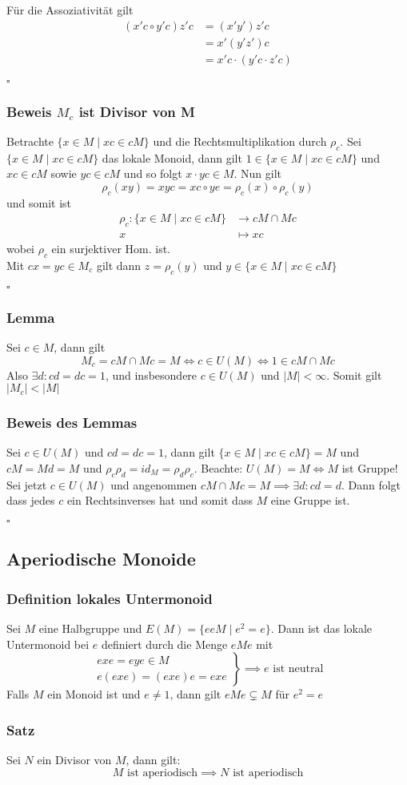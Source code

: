 \documentclass[12pt, german]{article}
\newcommand{\bewiesen}{
	
	\begin{flushright}
		$\square$  \\
\end{flushright}}
\begin{document}
	Für die Assoziativität gilt 
		\begin{align*}
			(x'c \circ y'c)z'c &= (x'y')z'c \\
				&= x'(y'z')c \\
				&= x'c \cdot (y'c \cdot z'c)
		\end{align*}
		\bewiesen

\subsubsection{Beweis $M_c$ ist Divisor von M}
	Betrachte $\{x \in M \mid xc \in cM\}$ und die Rechtsmultiplikation durch $\rho_c$. Sei $\{x \in M \mid xc \in cM\}$ das lokale Monoid, dann gilt $1 \in \{x \in M \mid xc \in cM\}$ und $xc \in cM$ sowie $yc \in cM$ und so folgt $x \cdot yc \in M$. Nun gilt $$\rho_c(xy) = xyc = xc \circ ye = \rho_c(x) \circ \rho_c(y)$$ und somit ist 
	\begin{align*}
		\rho_c : \{x \in M \mid xc \in cM\} &\to cM \cap Mc \\
		 x &\mapsto xc
	\end{align*} wobei $\rho_c$ ein surjektiver Hom. ist. \\
	Mit $cx = yc \in M_c$ gilt dann $z = \rho_c(y)$ und $y \in \{x \in M \mid xc \in cM\}$
	\bewiesen

\subsubsection{Lemma}
	Sei $c\in M$, dann gilt $$M_c = cM \cap Mc = M \iff c \in U(M) \iff 1 \in cM \cap Mc$$
	Also $\exists d : cd = dc = 1$, und insbesondere $c \in U(M)$ und $|M| < \infty$. Somit gilt $|M_c| < |M|$
	
\subsubsection{Beweis des Lemmas}
	Sei $c \in U(M)$ und $cd = dc = 1$, dann gilt $\{x \in M \mid xc \in cM\}  = M$ und $cM = Md = M$ und $\rho_c\rho_d = id_M = \rho_d\rho_c$. 
	Beachte: $U(M) = M \iff M$ ist Gruppe! 
	Sei jetzt $c \in U(M)$ und angenommen $cM \cap Mc = M \implies \exists d : cd = d$. Dann folgt dass jedes $c$ ein Rechtsinverses hat und somit dass $M$ eine Gruppe ist.
	\bewiesen
	
\subsection{Aperiodische Monoide}
\subsubsection{Definition lokales Untermonoid}
	Sei $M$ eine Halbgruppe  und $E(M) = \{eeM \mid e^2 = e\}$. Dann ist das lokale Untermonoid bei $e$ definiert durch die Menge $eMe$ mit 
	 \[
		\left. 
		\begin{array}{lr}
		exe = eye \in M\\
		e(exe) = (exe)e = exe 
		\end{array}\right\} \implies e \text{ ist neutral}
	\]
		Falls $M$ ein Monoid ist und $e\not = 1$, dann gilt $eMe \subsetneq M$ für $e^2 = e$

\subsubsection{Satz}
	Sei $N$ ein Divisor von $M$, dann gilt: $$M \text{ ist aperiodisch} \implies N \text{ ist aperiodisch}$$
\end{document}
